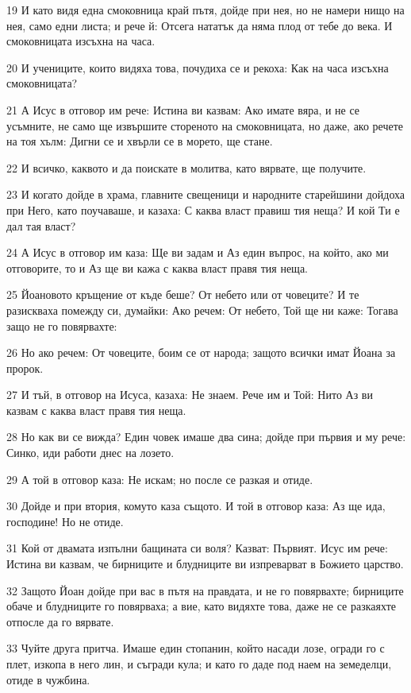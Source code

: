 \par 19 И като видя една смоковница край пътя, дойде при нея, но не намери нищо на нея, само едни листа; и рече й: Отсега нататък да няма плод от тебе до века. И смоковницата изсъхна на часа.
\par 20 И учениците, които видяха това, почудиха се и рекоха: Как на часа изсъхна смоковницата?
\par 21 А Исус в отговор им рече: Истина ви казвам: Ако имате вяра, и не се усъмните, не само ще извършите стореното на смоковницата, но даже, ако речете на тоя хълм: Дигни се и хвърли се в морето, ще стане.
\par 22 И всичко, каквото и да поискате в молитва, като вярвате, ще получите.
\par 23 И когато дойде в храма, главните свещеници и народните старейшини дойдоха при Него, като поучаваше, и казаха: С каква власт правиш тия неща? И кой Ти е дал тая власт?
\par 24 А Исус в отговор им каза: Ще ви задам и Аз един въпрос, на който, ако ми отговорите, то и Аз ще ви кажа с каква власт правя тия неща.
\par 25 Йоановото кръщение от къде беше? От небето или от човеците? И те разискваха помежду си, думайки: Ако речем: От небето, Той ще ни каже: Тогава защо не го повярвахте:
\par 26 Но ако речем: От човеците, боим се от народа; защото всички имат Йоана за пророк.
\par 27 И тъй, в отговор на Исуса, казаха: Не знаем. Рече им и Той: Нито Аз ви казвам с каква власт правя тия неща.
\par 28 Но как ви се вижда? Един човек имаше два сина; дойде при първия и му рече: Синко, иди работи днес на лозето.
\par 29 А той в отговор каза: Не искам; но после се разкая и отиде.
\par 30 Дойде и при втория, комуто каза същото. И той в отговор каза: Аз ще ида, господине! Но не отиде.
\par 31 Кой от двамата изпълни бащината си воля? Казват: Първият. Исус им рече: Истина ви казвам, че бирниците и блудниците ви изпреварват в Божието царство.
\par 32 Защото Йоан дойде при вас в пътя на правдата, и не го повярвахте; бирниците обаче и блудниците го повярваха; а вие, като видяхте това, даже не се разкаяхте отпосле да го вярвате.
\par 33 Чуйте друга притча. Имаше един стопанин, който насади лозе, огради го с плет, изкопа в него лин, и съгради кула; и като го даде под наем на земеделци, отиде в чужбина.
